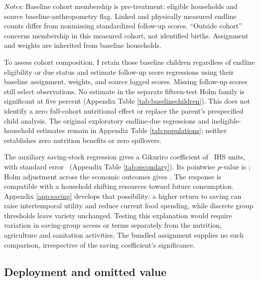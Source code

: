 \documentclass[11pt]{article}
\begin{document}
\begin{table}[t]
\centering\caption{Child cohort accounting under source anthropometry flags}\label{tab:childcohort}
\resizebox{\textwidth}{!}{}
\begin{minipage}{\textwidth}\footnotesize\emph{Notes:} Baseline cohort membership is pre-treatment: eligible households and source baseline-anthropometry flag. Linked and physically measured endline counts differ from nonmissing standardized follow-up scores. ``Outside cohort'' concerns membership in this measured cohort, not identified births. Assignment and weights are inherited from baseline households.\end{minipage}
\end{table}

To assess cohort composition, I retain those baseline children regardless of endline eligibility or due status and estimate follow-up score regressions using their baseline assignment, weights, and source lagged scores. Missing follow-up scores still select observations. No estimate in the separate fifteen-test Holm family is significant at five percent (Appendix Table \ref{tab:baselinechildren}). This does not identify a zero full-cohort nutritional effect or replace the parent's prespecified child analysis. The original exploratory endline-due regressions and ineligible-household estimates remain in Appendix Table \ref{tab:populations}; neither establishes zero nutrition benefits or zero spillovers.

The auxiliary saving-stock regression gives a Gikuriro coefficient of \GikuriroSavingEstimate\ IHS units, with standard error \GikuriroSavingSE\ (Appendix Table \ref{tab:secondary}). Its pointwise $p$-value is \GikuriroSavingP; Holm adjustment across the economic outcomes gives \GikuriroSavingHolmP. The response is compatible with a household shifting resources toward future consumption. Appendix \ref{app:saving} develops that possibility: a higher return to saving can raise intertemporal utility and reduce current food spending, while discrete group thresholds leave variety unchanged. Testing this explanation would require variation in saving-group access or terms separately from the nutrition, agriculture and sanitation activities. The bundled assignment supplies no such comparison, irrespective of the saving coefficient's significance.

\subsection{Deployment and omitted value}
\end{document}
